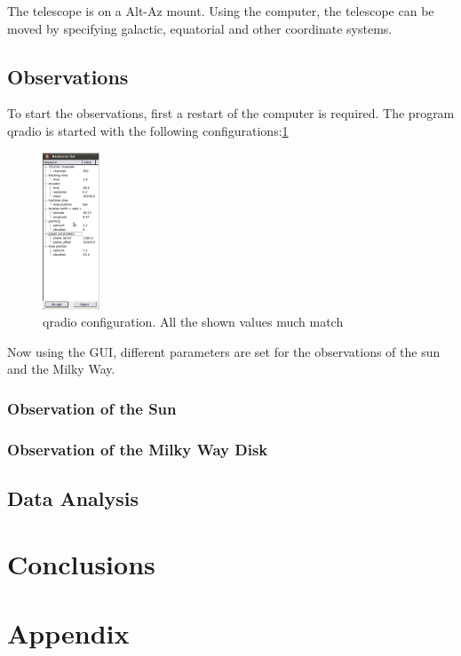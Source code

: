\documentclass[12pt,a4paper]{article}
\begin{document}
        The telescope is on a Alt-Az mount. Using the computer, the telescope can be moved by specifying galactic, equatorial and other coordinate systems.
    \subsection{Observations}
            To start the observations, first a restart of the computer is required. The program qradio is started with the following configurations:\ref{fig:qradio_config}
            \begin{figure}[H]
                \centering
                \includegraphics[width=0.15\textwidth]{qradio_config.png}
                \caption{qradio configuration. All the shown values much match}
                \label{fig:qradio_config}
            \end{figure} 

            Now using the GUI, different parameters are set for the observations of the sun and the Milky Way.
        \subsubsection{Observation of the Sun}
        \subsubsection{Observation of the Milky Way Disk}
            

    \subsection{Data Analysis}

\section{Conclusions}

\printbibliography     
\appendix
\section{Appendix}
\end{document}
